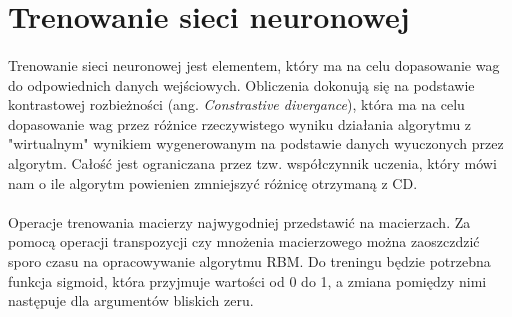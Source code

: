 \section{Trenowanie sieci neuronowej}
    \paragraph{}
        Trenowanie sieci neuronowej jest elementem, który ma na celu dopasowanie wag do odpowiednich danych wejściowych.
        Obliczenia dokonują się na podstawie kontrastowej rozbieżności (ang. \textit{Constrastive divergance}), która ma na celu
        dopasowanie wag przez różnice rzeczywistego wyniku działania algorytmu z "wirtualnym" wynikiem wygenerowanym na
        podstawie danych wyuczonych przez algorytm. Całość jest ograniczana przez tzw. współczynnik uczenia, który mówi
        nam o ile algorytm powienien zmniejszyć różnicę otrzymaną z CD.
    \paragraph{}
        Operacje trenowania macierzy najwygodniej przedstawić na macierzach. Za pomocą operacji transpozycji czy mnożenia
        macierzowego można zaoszczdzić sporo czasu na opracowywanie algorytmu RBM. Do treningu będzie potrzebna funkcja sigmoid,
        która przyjmuje wartości od 0 do 1,  a zmiana pomiędzy nimi następuje dla argumentów bliskich zeru.